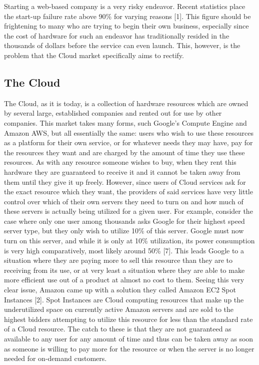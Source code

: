 \documentclass[thesis,proposal]{umassthesis}  %
\begin{document}
Starting a web-based company is a very risky endeavor. Recent statistics place the start-up failure rate above 90\% for varying reasons [1]. This figure should be frightening to many who are trying to begin their own business, especially since the cost of hardware for such an endeavor has traditionally resided in the thousands of dollars before the service can even launch. This, however, is the problem that the Cloud market specifically aims to rectify.

\subsection{The Cloud}
The Cloud, as it is today, is a collection of hardware resources which are owned by several large, established companies and rented out for use by other companies. This market takes many forms, such Google’s Compute Engine and Amazon AWS, but all essentially the same: users who wish to use these resources as a platform for their own service, or for whatever needs they may have, pay for the resources they want and are charged by the amount of time they use these resources. As with any resource someone wishes to buy, when they rent this hardware they are guaranteed to receive it and it cannot be taken away from them until they give it up freely. However, since users of Cloud services ask for the exact resource which they want, the providers of said services have very little control over which of their own servers they need to turn on and how much of these servers is actually being utilized for a given user.
	For example, consider the case where only one user among thousands asks Google for their highest speed server type, but they only wish to utilize 10\% of this server. Google must now turn on this server, and while it is only at 10\% utilization, its power consumption is very high comparatively, most likely around 50\% [7]. This leads Google to a situation where they are paying more to sell this resource than they are to receiving from its use, or at very least a situation where they are able to make more efficient use out of a product at almost no cost to them. Seeing this very clear issue, Amazon came up with a solution they called Amazon EC2 Spot Instances [2]. Spot Instances are Cloud computing resources that make up the underutilized space on currently active Amazon servers and are sold to the highest bidders attempting to utilize this resource for less than the standard rate of a Cloud resource. The catch to these is that they are not guaranteed as available to any user for any amount of time and thus can be taken away as soon as someone is willing to pay more for the resource or when the server is no longer needed for on-demand customers.
\end{document}
